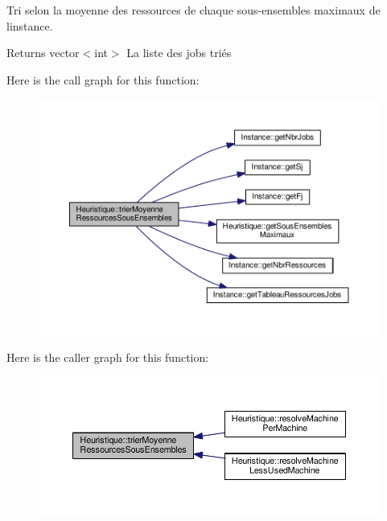Tri selon la moyenne des ressources de chaque sous-\/ensembles maximaux de l\textquotesingle{}instance. 

\begin{DoxyReturn}{Returns}
vector$<$int$>$ La liste des jobs triés 
\end{DoxyReturn}
Here is the call graph for this function\+:\nopagebreak
\begin{figure}[H]
\begin{center}
\leavevmode
\includegraphics[width=350pt]{classHeuristique_a9a5a00a6b2a9f0dc792491df1d7b6c67_cgraph}
\end{center}
\end{figure}
Here is the caller graph for this function\+:\nopagebreak
\begin{figure}[H]
\begin{center}
\leavevmode
\includegraphics[width=350pt]{classHeuristique_a9a5a00a6b2a9f0dc792491df1d7b6c67_icgraph}
\end{center}
\end{figure}
\mbox{\label{classHeuristique_a019587ee3112631f8369d8ffe6303f2c}} 
